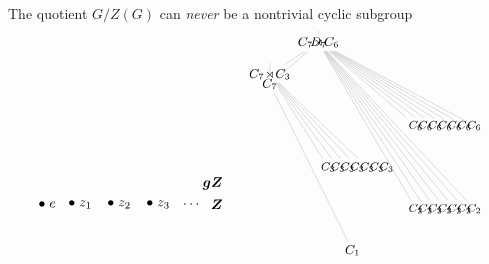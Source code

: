\documentclass[8pt, handout]{beamer}
\begin{document}
\begin{frame}{The quotient $G/Z(G)$ can \emph{never} be a nontrivial cyclic subgroup}
\[\begin{tikzpicture}[scale=.7]
\begin{scope}[shift={(0,0)},scale=1.5,xscale=1.1]
      \node[anchor=east] at (4.43,.77) {\normalsize $\bm{gZ}$};
      \node[anchor=west] at (.2,.27) {$\bullet\;e$};
      \node[anchor=west] at (.85,.27) {$\bullet\;z_1$};
      \node[anchor=west] at (1.7,.27) {$\bullet\;z_2$};
      \node[anchor=west] at (2.55,.27) {$\bullet\;z_3$};
      \node[anchor=west] at (3.35,.27) {$\cdots$};
      \node[anchor=east] at (4.43,.27) {\normalsize $\bm{Z}$};
    \end{scope}
    \begin{scope}[shift={(11.8,-1.25)},scale=1,shorten >= -1pt, shorten <= -1pt,xscale=.7,yscale=1.15]
      \tikzstyle{every node}=[font=\footnotesize]
      \node(G) at (-1.75,\Hh) {\small $C_7\!\rtimes\!C_6$};
      \node(C7-C3) at (-4.25,\Hg) {\small $C_7\!\rtimes\!C_3$};
      \node(D7) at (-1.75,\Hf) {\small $D_7$};
      \node(C7) at (-4.25,\He) {\small $C_7$};
      \node(C3-1) at (-1.25,\Hc) {$C_3$};
      \node(C3-2) at (-.75,\Hc) {$C_3$};
      \node(C3-3) at (-.25,\Hc) {$C_3$};
      \node(C3-4) at (.25,\Hc) {$C_3$};
      \node(C3-5) at (.75,\Hc) {$C_3$};
      \node(C3-6) at (1.25,\Hc) {$C_3$};
      \node(C3-7) at (1.75,\Hc) {$C_3$};
      \node(C6-1) at (3.25,\Hd) {$C_6$};
      \node(C6-2) at (3.75,\Hd) {$C_6$};
      \node(C6-3) at (4.25,\Hd) {$C_6$};
      \node(C6-4) at (4.75,\Hd) {$C_6$};
      \node(C6-5) at (5.25,\Hd) {$C_6$};
      \node(C6-6) at (5.75,\Hd) {$C_6$};
      \node(C6-7) at (6.25,\Hd) {$C_6$};
      \node(C2-1) at (3.25,\Hb) {$C_2$};
      \node(C2-2) at (3.75,\Hb) {$C_2$};
      \node(C2-3) at (4.25,\Hb) {$C_2$};
      \node(C2-4) at (4.75,\Hb) {$C_2$};
      \node(C2-5) at (5.25,\Hb) {$C_2$};
      \node(C2-6) at (5.75,\Hb) {$C_2$};
      \node(C2-7) at (6.25,\Hb) {$C_2$};
      \node(1) at (0,\Ha) {\small $C_1$};
      \draw[faded] (G) to (C7-C3);
      \draw[faded] (G) to (D7);
      \draw[faded] (G) to (C6-1);
      \draw[faded] (G) to (C6-2);
      \draw[faded] (G) to (C6-3);
      \draw[faded] (G) to (C6-4);
      \draw[faded] (G) to (C6-5);
      \draw[faded] (G) to (C6-6);
      \draw[faded] (G) to (C6-7);
      \draw[faded] (D7) to (C7);
      \draw[faded] (D7) to (C2-1);
      \draw[faded] (D7) to (C2-2);
      \draw[faded] (D7) to (C2-3);
      \draw[faded] (D7) to (C2-4);
      \draw[faded] (D7) to (C2-5);
      \draw[faded] (D7) to (C2-6);
      \draw[faded] (D7) to (C2-7);
      \draw[faded] (C7-C3) to (C7);
      \draw[faded] (C7) to (1);
      \draw[faded] (C7-C3) to (C3-1);
      \draw[faded] (C7-C3) to (C3-2);
      \draw[faded] (C7-C3) to (C3-3);
      \draw[faded] (C7-C3) to (C3-4);
      \draw[faded] (C7-C3) to (C3-5);

\end{scope}
\end{tikzpicture}\]
\end{frame}
\end{document}
